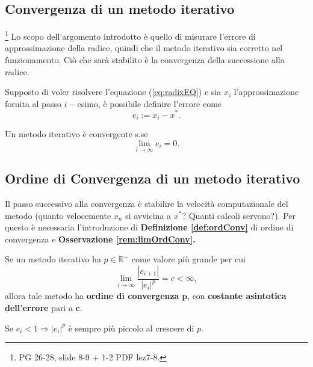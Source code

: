 \subsection{Convergenza di un metodo iterativo}\footnote{PG 26-28, slide 8-9 + 1-2 PDF lez7-8.} Lo scopo dell'argomento introdotto è quello di misurare l'errore di approssimazione della radice, quindi che il metodo iterativo sia corretto nel funzionamento. Ciò che sarà stabilito è la convergenza della successione alla radice.
\begin{definition}
	Supposto di voler risolvere l'equazione (\ref{eq:radixEQ}) e sia $x_i$ l'approssimazione fornita al passo $i-$esimo, è possibile definire l'errore come
	\begin{equation}\label{eq:errore_metodo_iterativo}
		e_i:=x_i-x^*.
	\end{equation}
\end{definition} 

\begin{definition}
	Un metodo iterativo è convergente s.se \begin{equation}\label{eq:limite_errore_metodo_convergente}
		\lim_{i\to\infty}{e_i}=0.
	\end{equation}
\end{definition}

\subsection{Ordine di Convergenza di un metodo iterativo}
Il passo successivo alla convergenza è stabilire la velocità computazionale del metodo (quanto velocemente $x_n$ si avvicina a $x^*$? Quanti calcoli servono?). Per questo è necessaria l'introduzione di \textbf{Definizione \ref{def:ordConv}} di ordine di convergenza e \textbf{Osservazione \ref{rem:limOrdConv}.}
\begin{definition} \label{def:ordConv}
	Se un metodo iterativo ha $p\in\mathbb R^+$ come valore più grande per cui \begin{equation}\label{eq:limOrdConv}
		\lim_{i\to\infty}{\frac{|e_{i+1}|}{|e_i|^p}}=c<\infty,
	\end{equation}
	allora tale metodo ha \textbf{ordine di convergenza} $\boldsymbol p$, con \textbf{costante asintotica dell'errore} pari a $\boldsymbol c$.
\end{definition}

\begin{remark}
	Se $e_i<1 \Rightarrow |e_i|^p$ è sempre più piccolo al crescere di $p$.
\end{remark}

